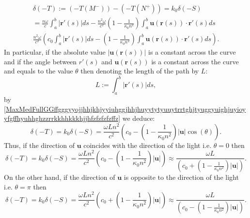 \documentclass{article}
\theoremstyle{definition}
\theoremstyle{remark}
\renewcommand{\vec}[1]{\mathbf{#1}}
\newcommand{\er}{\eqref}
\newcommand{\er}{\eqref}
\begin{document}
\begin{multline}\label{MaxMedFullGGffgggyyojjhhjkhjyyiuhggjhhjhuyytytyuuytrrtghjtyuggyuighjuyioyyfgffhyuhhghzzrrkkhhkkkhjjhfzfzfzfzffz}
\delta(-T):=\left(-T(M^-)\right)-
\left(-T(N^+)\right)=k_0\delta(-S)\\= \frac{n\omega}{c}\int_a^b
\left|\vec
r'(s)\right|ds-\frac{n^2\omega}{c^2}\left(1-\frac{1}{\kappa_0n^2}\right)\int_a^b\vec
u\left(\vec r(s)\right)\cdot\vec r'(s)ds\\
\frac{n^2\omega}{c^2}\left(c_0\int_a^b \left|\vec
r'(s)\right|ds-\left(1-\frac{1}{\kappa_0n^2}\right)\int_a^b\vec
u\left(\vec r(s)\right)\cdot\vec r'(s)ds\right).
\end{multline}
In particular, if the absolute value $\left|\vec u\left(\vec
r(s)\right)\right|$ is a constant across the curve and if the angle
between $r'(s)$ and $\vec u\left(\vec r(s)\right)$ is a constant
across the curve and equals to the value $\theta$ then denoting the
length of the path by $L$:
\begin{equation}\label{MaxMedFullGGffgggyyojjhhjkhjyyiuhggjhhjhuyytytyuuytrrtghjtyuggyuighjuyioyyfgffhyuhhghzzrrkkhhkkkhjjhjjfzuyy}
L:=\int_a^b \left|\vec r'(s)\right|ds,
\end{equation}
by
\er{MaxMedFullGGffgggyyojjhhjkhjyyiuhggjhhjhuyytytyuuytrrtghjtyuggyuighjuyioyyfgffhyuhhghzzrrkkhhkkkhjjhfzfzfzfzffz}
we deduce:
\begin{equation}\label{MaxMedFullGGffgggyyojjhhjkhjyyiuhggjhhjhuyytytyuuytrrtghjtyuggyuighjuyioyyfgffhyuhhghzzrrkkhhkkkhjjhfzfzfzfzffzghghgfz}
\delta(-T)=k_0\delta(-S)=\frac{\omega L
n^2}{c^2}\left(c_0-\left(1-\frac{1}{\kappa_0n^2}\right)|\vec
u|\cos{(\theta)}\right).
\end{equation}
Thus, if the direction of $\vec u$ coincides with the direction of
the light i.e. $\theta=0$ then
\begin{equation}\label{MaxMedFullGGffgggyyojjhhjkhjyyiuhggjhhjhuyytytyuuytrrtghjtyuggyuighjuyioyyfgffhyuhhghzzrrkkhhkkkhjjhfzfzfzfzffzghghgfzytyfz}
\delta(-T)=k_0\delta(-S)=\frac{\omega L
n^2}{c^2}\left(c_0-\left(1-\frac{1}{\kappa_0n^2}\right)|\vec
u|\right)\approx\frac{\omega
L}{\left(c_0+\left(1-\frac{1}{\kappa_0n^2}\right)|\vec u|\right)}.
\end{equation}
On the other hand, if the direction of $\vec u$ is opposite to the
direction of the light i.e. $\theta=\pi$ then
\begin{equation}\label{MaxMedFullGGffgggyyojjhhjkhjyyiuhggjhhjhuyytytyuuytrrtghjtyuggyuighjuyioyyfgffhyuhhghzzrrkkhhkkkhjjhfzfzfzfzffzghghgfzuyuyhffz}
\delta(-T)=k_0\delta(-S)=\frac{\omega L
n^2}{c^2}\left(c_0+\left(1-\frac{1}{\kappa_0n^2}\right)|\vec
u|\right)\approx\frac{\omega
L}{\left(c_0-\left(1-\frac{1}{\kappa_0n^2}\right)|\vec u|\right)}.
\end{equation}
\end{document}
